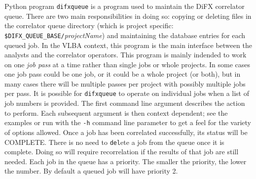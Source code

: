 Python program {\tt difxqueue} is a program used to maintain the DiFX correlator queue.
There are two main responsibilities in doing so: copying or deleting files in the correlator queue directory (which is project specific: {\tt \$DIFX\_QUEUE\_BASE/}{\em projectName}) and maintaining the database entries for each queued job.
In the VLBA context, this program is the main interface between the analysts and the correlator operators.
This program is mainly indended to work on one {\em job pass} at a time rather than single jobs or whole projects.
In some cases one job pass could be one job, or it could be a whole project (or both), but in many cases there will be multiple passes per project with possibly multiple jobs per pass.
It is possible for {\tt difxqueue} to operate on individual jobs when a list of job numbers is provided.
The first command line argument describes the action to perform.
Each subsequent argument is then context dependent; see the examples or run with the {\tt -h} command line parameter to get a feel for the variety of options allowed.
Once a job has been correlated successfully, its status will be COMPLETE.
There is no need to {\tt del}ete a job from the queue once it is complete. 
Doing so will require recorrelation if the results of that job are still needed.
Each job in the queue has a priority.
The smaller the priority, the lower the number.
By default a queued job will have priority 2.

